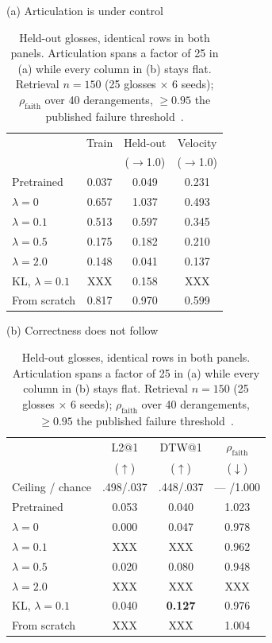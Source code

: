 \documentclass{article}
\begin{document}
\begin{table}[t]
\centering
\footnotesize
\caption{Held-out glosses, identical rows in both panels. Articulation spans a
factor of 25 in (a) while every column in (b) stays flat. Retrieval $n = 150$ (25
glosses $\times$ 6 seeds); $\rho_{\mathrm{faith}}$ over 40 derangements, $\geq
0.95$ the published failure threshold~\cite{hong2026collapse}.}
\label{tab:main}
\begin{minipage}[t]{0.47\textwidth}
\centering
(a) Articulation is under control \\[3pt]
\setlength{\tabcolsep}{5pt}
\begin{tabular}{lccc}
\toprule
 & Train & Held-out & Velocity \\
 & & ($\rightarrow$1.0) & ($\rightarrow$1.0) \\
\midrule
Pretrained            & 0.037 & 0.049 & 0.231 \\
$\lambda = 0$         & 0.657 & 1.037 & 0.493 \\
$\lambda = 0.1$       & 0.513 & 0.597 & 0.345 \\
$\lambda = 0.5$       & 0.175 & 0.182 & 0.210 \\
$\lambda = 2.0$       & 0.148 & 0.041 & 0.137 \\
KL, $\lambda = 0.1$   & XXX   & 0.158 & XXX   \\
From scratch          & 0.817 & 0.970 & 0.599 \\
\bottomrule
\end{tabular}
\end{minipage}
\hfill
\begin{minipage}[t]{0.47\textwidth}
\centering
(b) Correctness does not follow \\[3pt]
\setlength{\tabcolsep}{5pt}
\begin{tabular}{lccc}
\toprule
 & L2@1 & DTW@1 & $\rho_{\mathrm{faith}}$ \\
 & ($\uparrow$) & ($\uparrow$) & ($\downarrow$) \\
\midrule
Ceiling / chance      & .498/.037 & .448/.037 & --- /1.000 \\
\midrule
Pretrained            & 0.053 & 0.040 & 1.023 \\
$\lambda = 0$         & 0.000 & 0.047 & 0.978 \\
$\lambda = 0.1$       & XXX   & XXX   & 0.962 \\
$\lambda = 0.5$       & 0.020 & 0.080 & 0.948 \\
$\lambda = 2.0$       & XXX   & XXX   & XXX   \\
KL, $\lambda = 0.1$   & 0.040 & \textbf{0.127} & 0.976 \\
From scratch          & XXX   & XXX   & 1.004 \\
\bottomrule
\end{tabular}
\end{minipage}
\end{table}
\end{document}

